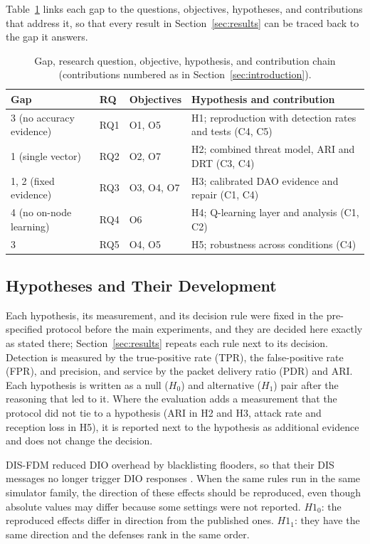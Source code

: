 Table~\ref{tab:chain} links each gap to the questions, objectives, hypotheses, and contributions that address it, so that every result in Section~\ref{sec:results} can be traced back to the gap it answers.

\begin{table}[t]
\caption{Gap, research question, objective, hypothesis, and contribution chain (contributions numbered as in Section~\ref{sec:introduction}).}\label{tab:chain}
\centering\footnotesize
\setlength{\tabcolsep}{4pt}
\begin{tabularx}{\columnwidth}{@{}lllX@{}}
\toprule
Gap & RQ & Objectives & Hypothesis and contribution \\
\midrule
3 (no accuracy evidence) & RQ1 & O1, O5 & H1; reproduction with detection rates and tests (C4, C5) \\
1 (single vector) & RQ2 & O2, O7 & H2; combined threat model, ARI and DRT (C3, C4) \\
1, 2 (fixed evidence) & RQ3 & O3, O4, O7 & H3; calibrated DAO evidence and repair (C1, C4) \\
4 (no on-node learning) & RQ4 & O6 & H4; Q-learning layer and analysis (C1, C2) \\
3 & RQ5 & O4, O5 & H5; robustness across conditions (C4) \\
\bottomrule
\end{tabularx}
\end{table}

\subsection{Hypotheses and Their Development}
Each hypothesis, its measurement, and its decision rule were fixed in the pre-specified protocol before the main experiments, and they are decided here exactly as stated there; Section~\ref{sec:results} repeats each rule next to its decision. Detection is measured by the true-positive rate (TPR), the false-positive rate (FPR), and precision, and service by the packet delivery ratio (PDR) and ARI. Each hypothesis is written as a null ($H_0$) and alternative ($H_1$) pair after the reasoning that led to it. Where the evaluation adds a measurement that the protocol did not tie to a hypothesis (ARI in H2 and H3, attack rate and reception loss in H5), it is reported next to the hypothesis as additional evidence and does not change the decision.

DIS-FDM reduced DIO overhead by blacklisting flooders, so that their DIS messages no longer trigger DIO responses \cite{prajisha2025}. When the same rules run in the same simulator family, the direction of these effects should be reproduced, even though absolute values may differ because some settings were not reported. $H1_0$: the reproduced effects differ in direction from the published ones. $H1_1$: they have the same direction and the defenses rank in the same order.

